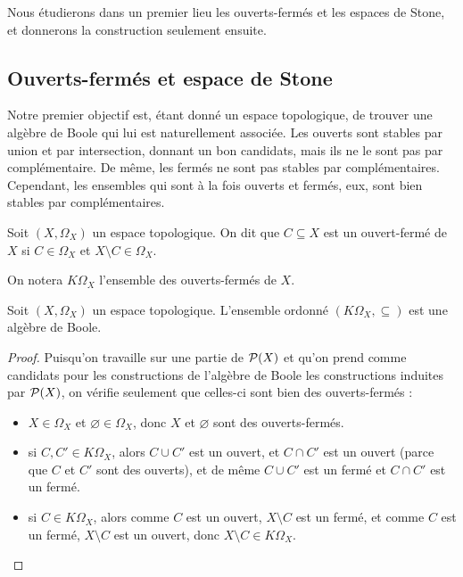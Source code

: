 Nous étudierons dans un premier lieu les ouverts-fermés et les espaces de Stone,
et donnerons la construction seulement ensuite.

\subsection{Ouverts-fermés et espace de Stone}

Notre premier objectif est, étant donné un espace topologique, de trouver une
algèbre de Boole qui lui est naturellement associée. Les ouverts sont stables
par union et par intersection, donnant un bon candidats, mais ils ne le sont pas
par complémentaire. De même, les fermés ne sont pas stables par complémentaires.
Cependant, les ensembles qui sont à la fois ouverts et fermés, eux, sont bien
stables par complémentaires.

\begin{definition}
  Soit $(X,\Omega_X)$ un espace topologique. On dit que $C\subseteq X$ est un
  ouvert-fermé de $X$ si $C\in \Omega_X$ et $X\setminus C \in \Omega_X$.

  On notera $K\Omega_X$ l'ensemble des ouverts-fermés de $X$.
\end{definition}

\begin{property}
  Soit $(X,\Omega_X)$ un espace topologique. L'ensemble ordonné
  $(K\Omega_X,\subseteq)$ est une algèbre de Boole.
\end{property}

\begin{proof}
  Puisqu'on travaille sur une partie de $\mathcal{P}(X)$ et qu'on prend comme
  candidats pour les constructions de l'algèbre de Boole les constructions
  induites par $\mathcal{P}(X)$, on vérifie seulement que celles-ci sont bien
  des ouverts-fermés :
  \begin{itemize}
  \item $X\in\Omega_X$ et $\varnothing\in\Omega_X$, donc $X$ et $\varnothing$
    sont des ouverts-fermés.
  \item si $C,C'\in K\Omega_X$, alors $C\cup C'$ est un ouvert, et $C\cap C'$
    est un ouvert (parce que $C$ et $C'$ sont des ouverts), et de même
    $C\cup C'$ est un fermé et $C\cap C'$ est un fermé.
  \item si $C\in K\Omega_X$, alors comme $C$ est un ouvert, $X\setminus C$ est
    un fermé, et comme $C$ est un fermé, $X\setminus C$ est un ouvert, donc
    $X\setminus C \in K\Omega_X$.
  \end{itemize}
\end{proof}

